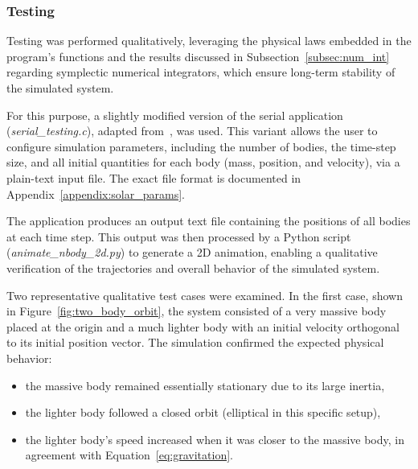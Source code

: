 \documentclass{article}
\begin{document}
\subsubsection{Testing}
Testing was performed qualitatively, leveraging the physical laws embedded in the program’s functions and the results discussed in Subsection~\ref{subsec:num_int} regarding symplectic numerical integrators, which ensure long-term stability of the simulated system.

For this purpose, a slightly modified version of the serial application (\emph{serial\_testing.c}), adapted from~\cite{wiki:n_body}, was used. This variant allows the user to configure simulation parameters, including the number of bodies, the time-step size, and all initial quantities for each body (mass, position, and velocity), via a plain-text input file. The exact file format is documented in Appendix~\ref{appendix:solar_params}.

The application produces an output text file containing the positions of all bodies at each time step. This output was then processed by a Python script (\emph{animate\_nbody\_2d.py}) to generate a 2D animation, enabling a qualitative verification of the trajectories and overall behavior of the simulated system.

Two representative qualitative test cases were examined.  
In the first case, shown in Figure~\ref{fig:two_body_orbit}, the system consisted of a very massive body placed at the origin and a much lighter body with an initial velocity orthogonal to its initial position vector.  
The simulation confirmed the expected physical behavior:  
\begin{itemize}
    \item the massive body remained essentially stationary due to its large inertia,
    \item the lighter body followed a closed orbit (elliptical in this specific setup),
    \item the lighter body’s speed increased when it was closer to the massive body, in agreement with Equation~\eqref{eq:gravitation}.
\end{itemize}
\end{document}
